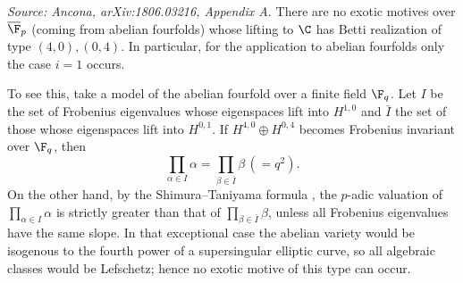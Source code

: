\begin{remark}
  \label{rem:exotic-no-top-type}
  \textit{Source: Ancona, arXiv:1806.03216, Appendix A.}
  There are no exotic motives over \(\overline{\F}_p\) (coming from abelian
  fourfolds) whose lifting to \(\C\) has Betti realization of type
  \((4,0),(0,4)\). In particular, for the application to abelian fourfolds only
  the case \(i = 1\) occurs.

  To see this, take a model of the abelian fourfold over a finite field
  \(\F_{q}\). Let \(I\) be the set of Frobenius eigenvalues whose eigenspaces lift
  into \(H^{1,0}\) and \(\bar I\) the set of those whose eigenspaces lift into
  \(H^{0,1}\). If \(H^{4,0} \oplus H^{0,4}\) becomes Frobenius invariant over
  \(\F_q\), then
  \[\prod_{\alpha \in I} \alpha = \prod_{\beta \in \bar I} \beta \, (= q^2).\]
  On the other hand, by the Shimura--Taniyama formula \cite[Lemma 5]{TateBour},
  the \(p\)-adic valuation of \(\prod_{\alpha \in I} \alpha\) is strictly greater
  than that of \(\prod_{\beta \in \bar I} \beta\), unless all Frobenius
  eigenvalues have the same slope. In that exceptional case the abelian variety
  would be isogenous to the fourth power of a supersingular elliptic curve, so all
  algebraic classes would be Lefschetz; hence no exotic motive of this type can
  occur.
\end{remark}
